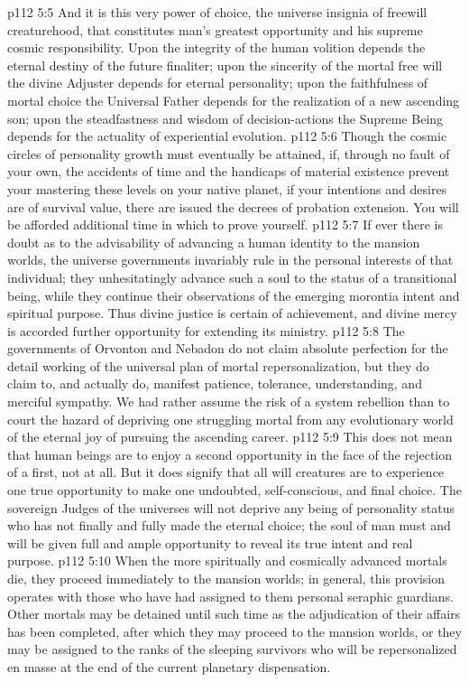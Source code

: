 \vs p112 5:5 And it is this very power of choice, the universe insignia of freewill creaturehood, that constitutes man’s greatest opportunity and his supreme cosmic responsibility. Upon the integrity of the human volition depends the eternal destiny of the future finaliter; upon the sincerity of the mortal free will the divine Adjuster depends for eternal personality; upon the faithfulness of mortal choice the Universal Father depends for the realization of a new ascending son; upon the steadfastness and wisdom of decision\hyp{}actions the Supreme Being depends for the actuality of experiential evolution.
\vs p112 5:6 \pc Though the cosmic circles of personality growth must eventually be attained, if, through no fault of your own, the accidents of time and the handicaps of material existence prevent your mastering these levels on your native planet, if your intentions and desires are of survival value, there are issued the decrees of probation extension. You will be afforded additional time in which to prove yourself.
\vs p112 5:7 If ever there is doubt as to the advisability of advancing a human identity to the mansion worlds, the universe governments invariably rule in the personal interests of that individual; they unhesitatingly advance such a soul to the status of a transitional being, while they continue their observations of the emerging morontia intent and spiritual purpose. Thus divine justice is certain of achievement, and divine mercy is accorded further opportunity for extending its ministry.
\vs p112 5:8 The governments of Orvonton and Nebadon do not claim absolute perfection for the detail working of the universal plan of mortal repersonalization, but they do claim to, and actually do, manifest patience, tolerance, understanding, and merciful sympathy. We had rather assume the risk of a system rebellion than to court the hazard of depriving one struggling mortal from any evolutionary world of the eternal joy of pursuing the ascending career.
\vs p112 5:9 This does not mean that human beings are to enjoy a second opportunity in the face of the rejection of a first, not at all. But it does signify that all will creatures are to experience one true opportunity to make one undoubted, self\hyp{}conscious, and final choice. The sovereign Judges of the universes will not deprive any being of personality status who has not finally and fully made the eternal choice; the soul of man must and will be given full and ample opportunity to reveal its true intent and real purpose.
\vs p112 5:10 When the more spiritually and cosmically advanced mortals die, they proceed immediately to the mansion worlds; in general, this provision operates with those who have had assigned to them personal seraphic guardians. Other mortals may be detained until such time as the adjudication of their affairs has been completed, after which they may proceed to the mansion worlds, or they may be assigned to the ranks of the sleeping survivors who will be repersonalized en masse at the end of the current planetary dispensation.
